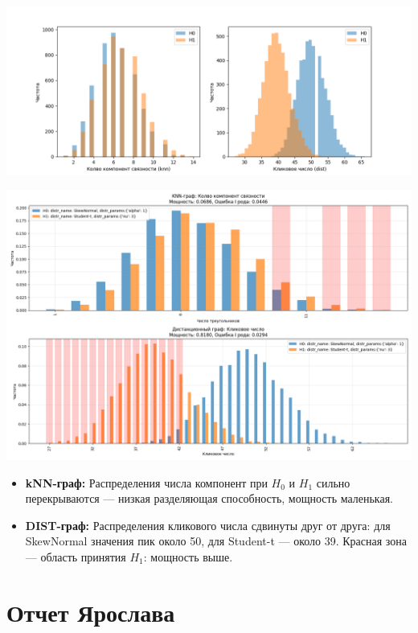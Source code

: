 \documentclass[12pt,a4paper]{article}
\begin{document}
\begin{center}
  \includegraphics[width=0.8\linewidth]{part3_results_0_Askar.png}
\end{center}
\begin{center}
  \includegraphics[width=\linewidth]{part3_results_1_Askar.png}
\end{center}

\begin{itemize}
  \item \textbf{kNN-граф:} Распределения числа компонент при $H_0$ и $H_1$ сильно перекрываются — низкая разделяющая способность, мощность маленькая.
  \item \textbf{DIST-граф:} Распределения кликового числа сдвинуты друг от друга: для SkewNormal значения пик около 50, для Student-t — около 39. Красная зона — область принятия $H_1$: мощность выше.
\end{itemize}


\newpage
\section*{Отчет Ярослава}
\end{document}
